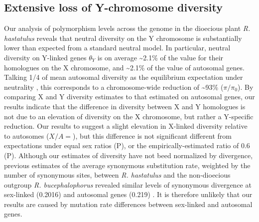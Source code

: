 \documentclass[9pt,twocolumn,twoside]{gsajnl}
\begin{document}
\subsection*{Extensive loss of Y-chromosome diversity}
Our analysis of polymorphism levels across the genome in the dioecious plant \textit{R. hastatulus} reveals that neutral diversity on the Y chromosome is substantially lower than expected from a standard neutral model. In particular, neutral diversity on Y-linked genes $\theta_{Y}$ is on average \textasciitilde 2.1\% of the value for their homologues on the X chromosome, and \textasciitilde 2.1\% of the value of autosomal genes. Talking 1/4 of mean autosomal diversity as the equilibrium expectation under neutrality \citep{wright1931evolution}, this corresponds to a chromosome-wide reduction of \textasciitilde 93\% ($\pi/\pi_{0}$). By comparing X and Y diversity estimates to that estimated on autosomal genes, our results indicate that the difference in diversity between X and Y homologues is not due to an elevation of diversity on the X chromosome, but rather a Y-specific reduction. Our results to suggest a slight elevation in X-linked diversity relative to autosomes ($X/A=$), but this difference is not significant different from expectations under equal sex ratios (P), or the empirically-estimated ratio of 0.6 (P). Although our estimates of diversity have not beed normalized by divergence, previous estimates of the average synonymous substitution rate, weighted by the number of synonymous sites, between \textit{R. hastatulus} and the non-dioecious outgroup \textit{R. bucephalophorus} revealed similar levels of synonymous divergence at sex-linked (0.2016) and autosomal genes (0.219) \citep{hough2014}. It is therefore unlikely that our results are caused by mutation rate differences between sex-linked and autosomal genes.



\end{document}
